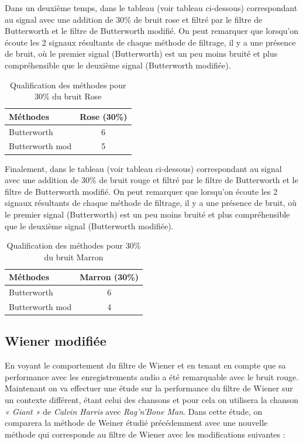\documentclass[conference,onecolumn]{IEEEtran}
\begin{document}
Dans un deuxième temps, dans le tableau (voir tableau ci-dessous) correspondant au signal avec une addition de 30\% de bruit rose et filtré par le filtre de Butterworth et le filtre de Butterworth modifié. On peut remarquer que lorsqu'on écoute les 2 signaux résultants de chaque méthode de filtrage, il y a une présence de bruit, où le premier signal (Butterworth) est un peu moins bruité et plus compréhensible que le deuxième signal (Butterworth modifiée).

\begin{table}[H]
    \centering
    \begin{tabular}{ l  c }
    \textbf{Méthodes} & \textbf{Rose (30\%)} \\
    \hline
    Butterworth &  6\\
    Butterworth mod &  5\\
    \end{tabular}
    \caption{Qualification des méthodes pour 30\% du bruit Rose}
    \label{table:t11}
\end{table}

Finalement, dans le tableau (voir tableau ci-dessous) correspondant au signal avec une addition de 30\% de bruit rouge et filtré par le filtre de Butterworth et le filtre de Butterworth modifié. On peut remarquer que lorsqu'on écoute les 2 signaux résultants de chaque méthode de filtrage, il y a une présence de bruit, où le premier signal (Butterworth) est un peu moins bruité et plus compréhensible que le deuxième signal (Butterworth modifiée).

\begin{table}[H]
    \centering
    \begin{tabular}{ l  c }
    \textbf{Méthodes} & \textbf{Marron (30\%)} \\
    \hline
    Butterworth &  6\\
    Butterworth mod &  4\\
    \end{tabular}
    \caption{Qualification des méthodes pour 30\% du bruit Marron}
    \label{table:t12}
\end{table}


\subsection{\textbf{Wiener modifiée}}
En voyant le comportement du filtre de Wiener et en tenant en compte que sa performance avec les enregistrements audio a été remarquable avec le bruit rouge. Maintenant on va effectuer une étude sur la performance du filtre de Wiener sur un contexte différent, étant celui des chansons et pour cela on utilisera la chanson \textit{« Giant »} de \textit{ Calvin Harris } avec \textit{Rag'n'Bone Man}. Dans cette étude, on comparera la méthode de Weiner étudié précédemment avec une nouvelle méthode qui corresponde au filtre de Wiener avec les modifications suivantes :
\end{document}
